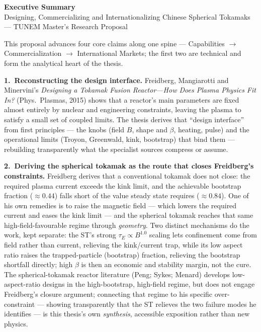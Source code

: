 \documentclass[11pt]{article}
\begin{document}
\begin{center}
{\large\textbf{Executive Summary}}\\[2pt]
{\small Designing, Commercializing and Internationalizing Chinese Spherical Tokamaks --- TUNEM Master's Research Proposal}
\end{center}
\vspace{2pt}

This proposal advances four core claims along one spine --- Capabilities $\rightarrow$ Commercialization $\rightarrow$ International Markets; the first two are technical and form the analytical heart of the thesis.

\textbf{1.~Reconstructing the design interface.} Freidberg, Mangiarotti and Minervini's \emph{Designing a Tokamak Fusion Reactor---How Does Plasma Physics Fit In?} (Phys.\ Plasmas, 2015) shows that a reactor's main parameters are fixed almost entirely by nuclear and engineering constraints, leaving the plasma to satisfy a small set of coupled limits. The thesis derives that ``design interface'' from first principles --- the knobs (field $B$, shape and $\beta$, heating, pulse) and the operational limits (Troyon, Greenwald, kink, bootstrap) that bind them --- rebuilding transparently what the specialist sources compress or assume.

\textbf{2.~Deriving the spherical tokamak as the route that closes Freidberg's constraints.} Freidberg derives that a conventional tokamak does not close: the required plasma current exceeds the kink limit, and the achievable bootstrap fraction ($\approx 0.44$) falls short of the value steady state requires ($\approx 0.84$). One of his own remedies is to raise the magnetic field --- which lowers the required current and eases the kink limit --- and the spherical tokamak reaches that same high-field-favourable regime through \emph{geometry}. Two distinct mechanisms do the work, kept separate: the ST's strong $\tau_E\propto B^{1.0}$ scaling lets confinement come from field rather than current, relieving the kink/current trap, while its low aspect ratio raises the trapped-particle (bootstrap) fraction, relieving the bootstrap shortfall directly; high $\beta$ is then an economic and stability margin, not the cure. The spherical-tokamak reactor literature (Peng; Sykes; Menard) develops low-aspect-ratio designs in the high-bootstrap, high-field regime, but does not engage Freidberg's closure argument; connecting that regime to his specific over-constraint --- showing transparently that the ST relieves the two failure modes he identifies --- is this thesis's own \emph{synthesis}, accessible exposition rather than new physics.
\end{document}
